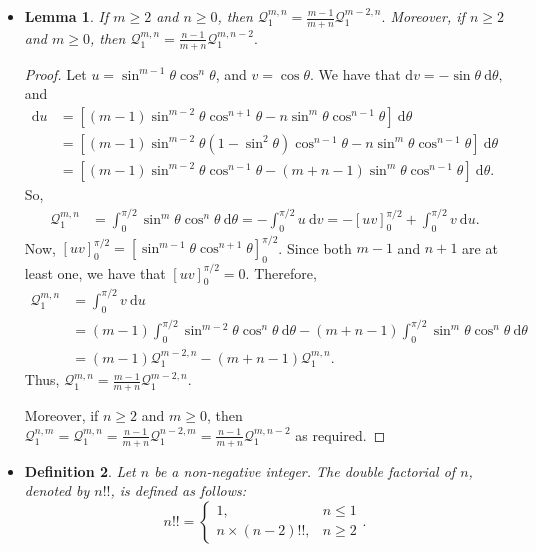 \documentclass[10pt]{article}
\newtheorem{lemma}{Lemma}[section]
\newtheorem{definition}[lemma]{Definition}
\newcommand{\dee}{\mathrm{d}}
\begin{document}
\begin{itemize}
			\item \begin{lemma} \label{reduction}
				If $m \geq 2$ and $n \geq 0$, then $\mathcal{Q}_1^{m,n} = \frac{m-1}{m+n} \mathcal{Q}_1^{m-2,n}.$
				Moreover, if $n \geq 2$ and $m \geq 0$, then $\mathcal{Q}_1^{m,n} = \frac{n-1}{m+n} \mathcal{Q}_1^{m,n-2}.$
			\end{lemma}
			\begin{proof}
				Let $u = \sin^{m-1} \theta \cos^{n} \theta$, and $v = \cos\theta.$
				We have that $\dee v = -\sin\theta\ \dee \theta,$ and
				\begin{align*}
					\dee u 
					&= [(m-1) \sin^{m-2} \theta \cos^{n+1} \theta - n \sin^{m} \theta \cos^{n-1} \theta]\ \dee \theta \\
					&= [(m-1) \sin^{m-2} \theta (1 - \sin^2 \theta) \cos^{n-1} \theta - n \sin^{m} \theta \cos^{n-1} \theta]\ \dee \theta\\
					&= [(m-1) \sin^{m-2} \theta \cos^{n-1} \theta - (m+n-1) \sin^{m} \theta \cos^{n-1} \theta]\ \dee \theta.					
				\end{align*}
				So, 				
				\begin{align*}
					\mathcal{Q}_1^{m,n} 
					&= \int_{0}^{\pi/2} \sin^m \theta \cos^{n} \theta\ \dee\theta 
					= -\int_{0}^{\pi/2} u\ \dee v
					= -[uv]_{0}^{\pi/2} + \int_{0}^{\pi/2} v\ \dee u.
				\end{align*}
				Now, $[uv]_0^{\pi/2} = [\sin^{m-1} \theta \cos^{n+1} \theta]_0^{\pi/2}$. 
				Since both $m-1$ and $n+1$ are at least one, we have that $[uv]_0^{\pi/2} = 0.$
				Therefore,
				\begin{align*}
					\mathcal{Q}_1^{m,n} 
					&= \int_{0}^{\pi/2} v\ \dee u\\
					&= (m-1) \int_0^{\pi/2} \sin^{m-2} \theta \cos^n \theta\ \dee\theta - (m+n-1) \int_{0}^{\pi/2} \sin^{m} \theta \cos^{n} \theta\ \dee \theta\\
					&= (m-1) \mathcal{Q}_1^{m-2,n} - (m+n-1) \mathcal{Q}_1^{m,n}.
				\end{align*}
				Thus, $\mathcal{Q}_1^{m,n} = \frac{m-1}{m+n} \mathcal{Q}_1^{m-2,n}.$ 
				
				Moreover, if $n\geq 2$ and $m \geq 0$, then $\mathcal{Q}_1^{n,m} = 
				\mathcal{Q}_1^{m,n} = \frac{n-1}{m+n} \mathcal{Q}_1^{n-2,m} = \frac{n-1}{m+n} \mathcal{Q}_1^{m,n-2}$
				as required.
			\end{proof}
			
			\item \begin{definition}
				Let $n$ be a non-negative integer. The \emph{double factorial} of $n$, 
				denoted by $n!!$, is defined as follows:
				$$n!! = \begin{cases} 1, & n \leq 1 \\ n \times (n-2)!!, & n\geq 2 \end{cases}.$$
			\end{definition}
						

\end{itemize}
\end{document}
